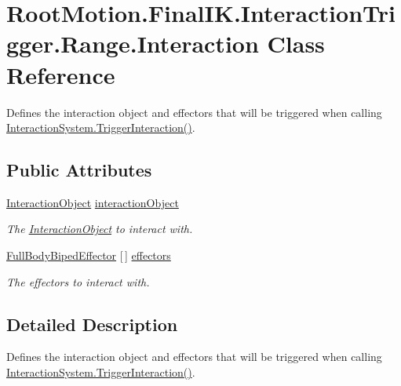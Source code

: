 \hypertarget{class_root_motion_1_1_final_i_k_1_1_interaction_trigger_1_1_range_1_1_interaction}{}\section{Root\+Motion.\+Final\+I\+K.\+Interaction\+Trigger.\+Range.\+Interaction Class Reference}
\label{class_root_motion_1_1_final_i_k_1_1_interaction_trigger_1_1_range_1_1_interaction}


Defines the interaction object and effectors that will be triggered when calling \mbox{\hyperlink{class_root_motion_1_1_final_i_k_1_1_interaction_system_a652cbce893d957ae9604d8ef8a99fe90}{Interaction\+System.\+Trigger\+Interaction()}}.  


\subsection*{Public Attributes}
\begin{DoxyCompactItemize}
\item 
\mbox{\hyperlink{class_root_motion_1_1_final_i_k_1_1_interaction_object}{Interaction\+Object}} \mbox{\hyperlink{class_root_motion_1_1_final_i_k_1_1_interaction_trigger_1_1_range_1_1_interaction_a8c8029eb2f39c34790868d106352439d}{interaction\+Object}}
\begin{DoxyCompactList}\small\item\em The \mbox{\hyperlink{class_root_motion_1_1_final_i_k_1_1_interaction_object}{Interaction\+Object}} to interact with. \end{DoxyCompactList}\item 
\mbox{\hyperlink{namespace_root_motion_1_1_final_i_k_ae0dd2058c7667b6f132c11a6b860c14a}{Full\+Body\+Biped\+Effector}} \mbox{[}$\,$\mbox{]} \mbox{\hyperlink{class_root_motion_1_1_final_i_k_1_1_interaction_trigger_1_1_range_1_1_interaction_a4b3243c3362084e59c161a66afb336c7}{effectors}}
\begin{DoxyCompactList}\small\item\em The effectors to interact with. \end{DoxyCompactList}\end{DoxyCompactItemize}


\subsection{Detailed Description}
Defines the interaction object and effectors that will be triggered when calling \mbox{\hyperlink{class_root_motion_1_1_final_i_k_1_1_interaction_system_a652cbce893d957ae9604d8ef8a99fe90}{Interaction\+System.\+Trigger\+Interaction()}}. 



